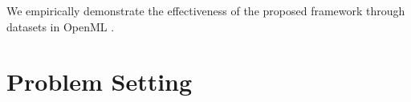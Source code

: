 %
We empirically demonstrate the effectiveness of the proposed framework through datasets in OpenML \cite{OpenML2013}.
%

\section{Problem Setting} %
\label{sec:CASH}




